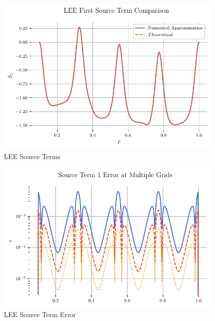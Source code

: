 \begin{figure}[h!]
    \centering
    \includegraphics{../../../CodeRun/04-plotReport/tex-outputs/MMS1_SourceTermComparison1.pdf}
    \caption{LEE Source Terms}
    \label{fig:6}
\end{figure}

\begin{figure}[h!]
    \centering
    \includegraphics{../../../CodeRun/04-plotReport/tex-outputs/MMS1_SourceTermError1.pdf}
    \caption{LEE Source Term Error}
    \label{fig:7}
\end{figure}


